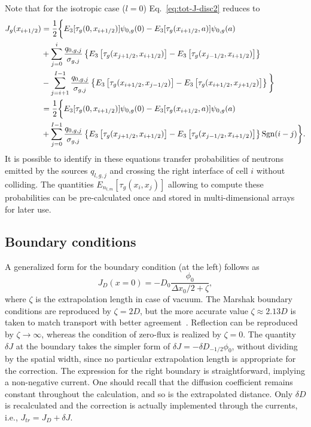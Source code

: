 Note that for the isotropic case ($l=0$) Eq.~\eqref{eq:tot-J-disc2} reduces to
\begin{equation}\label{eq:tot-J-disc2-l=0}
\begin{split}
J_g(x_{i+1/2}) &= \frac{1}{2}
\bigg\{
E_3[\tau_g(0,x_{i+1/2})] \psi_{0,g}(0) 
- E_3[\tau_g(x_{i+1/2},a)]\psi_{0,g}(a) \\
&+
\sum\limits_{j=0}^i \frac{q_{0,g,j}}{\sigma_{g,j}} 
\left\{
E_3\left[
\tau_g(x_{j+1/2},x_{i+1/2}) \right] 
- E_3\left[
\tau_g(x_{j-1/2},x_{i+1/2})
\right] 
\right\} \\
&-
\sum\limits_{j=i+1}^{I-1} \frac{q_{0,g,j}}{\sigma_{g,j}} 
\left\{
E_3\left[
\tau_g(x_{i+1/2},x_{j-1/2}) \right] 
- E_3\left[
\tau_g(x_{i+1/2},x_{j+1/2})
\right]
\right\}
\bigg\}	\\
&=\frac{1}{2}
\bigg\{
E_3[\tau_g(0,x_{i+1/2})] \psi_{0,g}(0) 
- E_3[\tau_g(x_{i+1/2},a)]\psi_{0,g}(a) \\
&+
\sum\limits_{j=0}^{I-1} \frac{q_{0,g,j}}{\sigma_{g,j}} 
\left\{
E_3\left[
\tau_g(x_{j+1/2},x_{i+1/2}) \right] 
- E_3\left[
\tau_g(x_{j-1/2},x_{i+1/2})
\right] 
\right\}\operatorname{Sgn}(i-j)
\bigg\}. 
\end{split}
\end{equation}
It is possible to identify in these equations transfer probabilities of neutrons emitted by the sources $q_{l,g,j}$ and crossing the right interface of cell $i$ without colliding. The quantities $E_{n_{l,m}}[\tau_g(x_i,x_j)]$ allowing to compute these probabilities can be pre-calculated once and stored in multi-dimensional arrays for later use.

%
\subsection{Boundary conditions}
\label{sec:BC}
A generalized form for the boundary condition (at the left) follows as
\begin{equation}\label{eq:BC}
J_D(x=0) = -D_0\frac{\phi_0}{\Delta x_0/2 + \zeta},
\end{equation} 
where $\zeta$ is the extrapolation length in case of vacuum. The Marshak boundary conditions are reproduced by $\zeta=2D$, but the more accurate value $\zeta\approx 2.13D$ is taken to match transport with better agreement~\cite{Lamarsh-1966}. Reflection can be reproduced by $\zeta\rightarrow\infty$, whereas the condition of zero-flux is realized by $\zeta=0$. 
%
The quantity $\delta J$ at the boundary takes the simpler form of $\delta J = -\delta D_{-1/2}\phi_0$, without dividing by the spatial width, since no particular extrapolation length is appropriate for the correction. The expression for the right boundary is straightforward, implying a non-negative current. One should recall that the diffusion coefficient remains constant throughout the calculation, and so is the extrapolated distance. Only $\delta D$ is recalculated and the correction is actually implemented through the currents, i.e., $J_{tr} = J_D + \delta J$.

